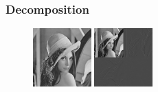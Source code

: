 \documentclass{beamer}
\def\RImageSize{0.2\textwidth}
\def\RImageSpace{\hspace{1cm}}
\begin{document}
\begin{frame}
  \frametitle{Decomposition}

  \begin{figure}[hbt]
    \begin{center}
      \includegraphics[width=\RImageSize]{lena512.jpg}
      \RImageSpace
      \pause
      \includegraphics[width=\RImageSize]{lena-1step.jpg}

\end{center}
\end{figure}
\end{frame}
\end{document}
